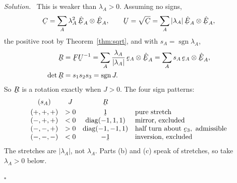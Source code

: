\documentclass[17pt,a4paper]{extreport}
\DeclareRobustCommand{\vek}[1]{\underaccent{\tilde}{#1}}
\newcommand{\bC}{\vek{C}}
\newcommand{\bF}{\vek{F}}
\newcommand{\bR}{\vek{R}}
\newcommand{\bU}{\vek{U}}
\newcommand{\be}{\vek{e}}
\newcommand{\hbE}{\hat{\vek{E}}}
\newcommand{\shift}{\vek{1}}
\theoremstyle{scplain}
\theoremstyle{scdefn}
\newenvironment{solution}{\par\smallskip\noindent\textit{Solution.}\ }
  {\hfill$\square$\par\smallskip}
\begin{document}
\begin{solution}
This is weaker than $\lambda_{A}>0$. Assuming no signs,
\[
   \bC=\sum_{A}\lambda_{A}^{2}\,\hbE_{A}\otimes\hbE_{A},
   \qquad
   \bU=\sqrt{\bC}=\sum_{A}|\lambda_{A}|\,\hbE_{A}\otimes\hbE_{A},
\]
the positive root by Theorem~\ref{thm:sqrt}, and with
$s_{A}=\operatorname{sgn}\lambda_{A}$,
\[
\begin{aligned}
   \bR&=\bF\bU^{-1}
   =\sum_{A}\frac{\lambda_{A}}{|\lambda_{A}|}\,\be_{A}\otimes\hbE_{A}
   =\sum_{A}s_{A}\,\be_{A}\otimes\hbE_{A},\\
   \det\bR&=s_{1}s_{2}s_{3}=\operatorname{sgn}J .
\end{aligned}
\]
So $\bR$ is a rotation exactly when $J>0$. The four sign patterns:
\[
\begin{array}{cccl}
   (s_{A}) & J & \bR & \\[1mm]
   (+,+,+) & >0 & \shift & \text{pure stretch}\\
   (-,+,+) & <0 & \operatorname{diag}(-1,1,1) & \text{mirror, excluded}\\
   (-,-,+) & >0 & \operatorname{diag}(-1,-1,1) &
     \text{half turn about }\be_{3},\ \text{admissible}\\
   (-,-,-) & <0 & -\shift & \text{inversion, excluded}
\end{array}
\]
The stretches are $|\lambda_{A}|$, not $\lambda_{A}$. Parts (b) and (c)
speak of stretches, so take $\lambda_{A}>0$ below.



\end{solution}
\end{document}
